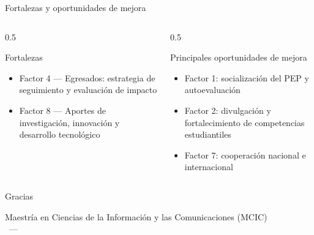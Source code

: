 \documentclass[aspectratio=169, 11pt]{beamer}
\begin{document}
\begin{frame}{Fortalezas y oportunidades de mejora}
  \begin{columns}[T]
    \begin{column}{0.5\textwidth}
      \begin{alertblock}{Fortalezas}
        \small
        \begin{itemize}
          \item Factor 4 --- Egresados: estrategia de seguimiento y evaluación de impacto
          \item Factor 8 --- Aportes de investigación, innovación y desarrollo tecnológico
        \end{itemize}
      \end{alertblock}
    \end{column}
    \begin{column}{0.5\textwidth}
      \begin{block}{Principales oportunidades de mejora}
        \small
        \begin{itemize}
          \item Factor 1: socialización del PEP y autoevaluación
          \item Factor 2: divulgación y fortalecimiento de competencias estudiantiles
          \item Factor 7: cooperación nacional e internacional
        \end{itemize}
      \end{block}
    \end{column}
  \end{columns}
\end{frame}

\begin{frame}[standout]
  Gracias

  \vspace{0.5cm}
  {\normalsize Maestría en Ciencias de la Información y las Comunicaciones (MCIC)\\
  \Facultad\ --- \Institucion}
\end{frame}
\end{document}
